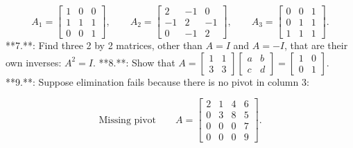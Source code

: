 \[A_{1}=\begin{bmatrix}1&0&0\\ 1&1&1\\ 0&0&1\end{bmatrix},\qquad A_{2}=\begin{bmatrix}2&-1&0\\ -1&2&-1\\ 0&-1&2\end{bmatrix},\qquad A_{3}=\begin{bmatrix}0&0&1\\ 0&1&1\\ 1&1&1\end{bmatrix}.\]
**7.**: Find three 2 by 2 matrices, other than \(A=I\) and \(A=-I\), that are their own inverses: \(A^{2}=I\).
**8.**: Show that \(A=\begin{bmatrix}1&1\\ 3&3\end{bmatrix}\begin{bmatrix}a&b\\ c&d\end{bmatrix}=\begin{bmatrix}1&0\\ 0&1\end{bmatrix}.\)
**9.**: Suppose elimination fails because there is no pivot in column 3:

\[\text{{Missing pivot}}\qquad A=\begin{bmatrix}2&1&4&6\\ 0&3&8&5\\ 0&0&0&7\\ 0&0&0&9\end{bmatrix}.\] 